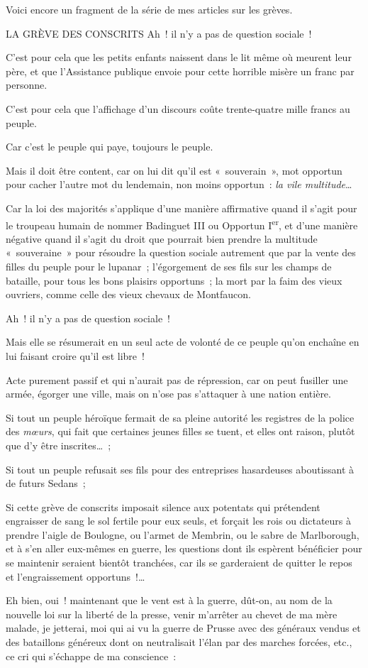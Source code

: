\documentclass[french,twoside]{book} %
\newenvironment{quoteblock}%
  {\begin{quoting}}
  {\end{quoting}}
\newenvironment{quotebar}{%
    \def\FrameCommand{{\color{rubric!10!}\vrule width 0.5em} \hspace{0.9em}}%
    \def\OuterFrameSep{\itemsep} %
    \MakeFramed {\advance\hsize-\width \FrameRestore}
  }%
  {%
    \endMakeFramed
  }
\renewenvironment{quoteblock}%
  {%
    \savenotes
    \setstretch{0.9}
    \normalfont
    \begin{quotebar}
  }
  {%
    \end{quotebar}
    \spewnotes
  }
\begin{document}
\noindent Voici encore un fragment de la série de mes articles sur les grèves.\par

\begin{quoteblock}
 LA GRÈVE DES CONSCRITS \noindent Ah ! il n’y a pas de question sociale !\par
 C’est pour cela que les petits enfants naissent dans le lit même où meurent leur père, et que l’Assistance publique envoie pour cette horrible misère un franc par personne.\par
 C’est pour cela que l’affichage d’un discours coûte trente-quatre mille francs au peuple.\par
 Car c’est le peuple qui paye, toujours le peuple.\par
 Mais il doit être content, car on lui dit qu’il est « souverain », mot opportun pour cacher l’autre mot du lendemain, non moins opportun : \emph{la vile multitude}…\par
 Car la loi des majorités s’applique d’une manière affirmative quand il s’agit pour le troupeau humain de nommer Badinguet III ou Opportun I\textsuperscript{er}, et d’une manière négative quand il s’agit du droit que pourrait bien prendre la multitude « souveraine » pour résoudre la question sociale autrement que par la vente des filles du peuple pour le lupanar ; l’égorgement de ses fils sur les champs  de bataille, pour tous les bons plaisirs opportuns ; la mort par la faim des vieux ouvriers, comme celle des vieux chevaux de Montfaucon.\par
 Ah ! il n’y a pas de question sociale !\par
 Mais elle se résumerait en un seul acte de volonté de ce peuple qu’on enchaîne en lui faisant croire qu’il est libre !\par
 Acte purement passif et qui n’aurait pas de répression, car on peut fusiller une armée, égorger une ville, mais on n’ose pas s’attaquer à une nation entière.\par
 Si tout un peuple héroïque fermait de sa pleine autorité les registres de la police des \emph{mœurs}, qui fait que certaines jeunes filles se tuent, et elles ont raison, plutôt que d’y être inscrites… ;\par
 Si tout un peuple refusait ses fils pour des entreprises hasardeuses aboutissant à de futurs Sedans ;\par
 Si cette grève de conscrits imposait silence aux potentats qui prétendent engraisser de sang le sol fertile pour eux seuls, et forçait les rois ou dictateurs à prendre l’aigle de Boulogne, ou l’armet de Membrin, ou le sabre de Marlborough, et à s’en aller eux-mêmes en guerre, les questions dont ils espèrent bénéficier pour se maintenir seraient bientôt tranchées, car ils se garderaient de quitter le repos et l’engraissement opportuns !…\par
 Eh bien, oui ! maintenant que le vent est à la guerre, dût-on, au nom de la nouvelle loi sur la liberté de la presse, venir m’arrêter au chevet de ma mère malade, je jetterai, moi qui ai vu la guerre de Prusse avec des généraux vendus et des bataillons généreux dont on neutralisait l’élan par des marches forcées, etc., ce cri qui s’échappe de ma conscience : \par
 

\end{quoteblock}
\end{document}
